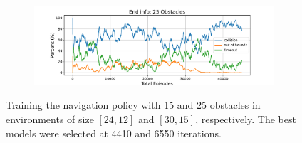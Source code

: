 \begin{figure}[htb]
\begin{subfigure}[b]{\textwidth}
        \label{fig:25_obst_nav_rew}
    \end{subfigure} \\
    \begin{subfigure}[b]{\textwidth}
        \centering
        \captionsetup{justification=centering}
        \includegraphics[width=0.98\textwidth]{figures/7_/3DCarModel_BodyObs_NavSetup_25_NewObs_EnvSpace15_last7600_v1_again_end_info.pdf}
        \label{fig:25_obst_nav_end}
    \end{subfigure} 
    \caption{Training the navigation policy with 15 and 25 obstacles in environments of size  $[24, 12]$ and $[30, 15]$, respectively. The best models were selected at 4410 and 6550 iterations.}
    \label{fig:7_train_nav_25_obst}
\end{figure}